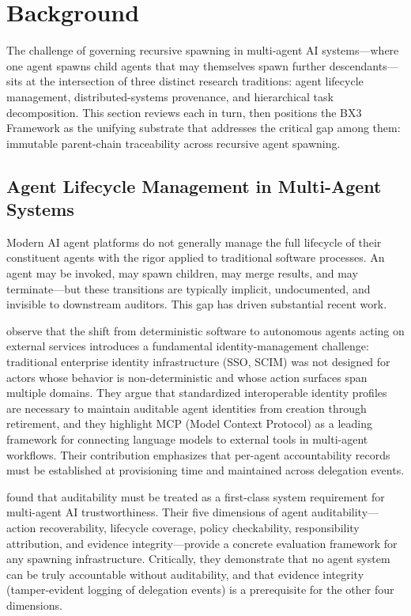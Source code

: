 \section{Background}
\label{sec:background}

The challenge of governing recursive spawning in multi-agent AI systems---where one agent spawns child agents that may themselves spawn further descendants---sits at the intersection of three distinct research traditions: agent lifecycle management, distributed-systems provenance, and hierarchical task decomposition. This section reviews each in turn, then positions the BX3 Framework as the unifying substrate that addresses the critical gap among them: immutable parent-chain traceability across recursive agent spawning.

\subsection{Agent Lifecycle Management in Multi-Agent Systems}
\label{sec:lifecycle}

Modern AI agent platforms do not generally manage the full lifecycle of their constituent agents with the rigor applied to traditional software processes. An agent may be invoked, may spawn children, may merge results, and may terminate---but these transitions are typically implicit, undocumented, and invisible to downstream auditors. This gap has driven substantial recent work.

 observe that the shift from deterministic software to autonomous agents acting on external services introduces a fundamental identity-management challenge: traditional enterprise identity infrastructure (SSO, SCIM) was not designed for actors whose behavior is non-deterministic and whose action surfaces span multiple domains. They argue that standardized interoperable identity profiles are necessary to maintain auditable agent identities from creation through retirement, and they highlight MCP (Model Context Protocol) as a leading framework for connecting language models to external tools in multi-agent workflows. Their contribution emphasizes that per-agent accountability records must be established at provisioning time and maintained across delegation events.

 found that auditability must be treated as a first-class system requirement for multi-agent AI trustworthiness. Their five dimensions of agent auditability---action recoverability, lifecycle coverage, policy checkability, responsibility attribution, and evidence integrity---provide a concrete evaluation framework for any spawning infrastructure. Critically, they demonstrate that no agent system can be truly accountable without auditability, and that evidence integrity (tamper-evident logging of delegation events) is a prerequisite for the other four dimensions.

